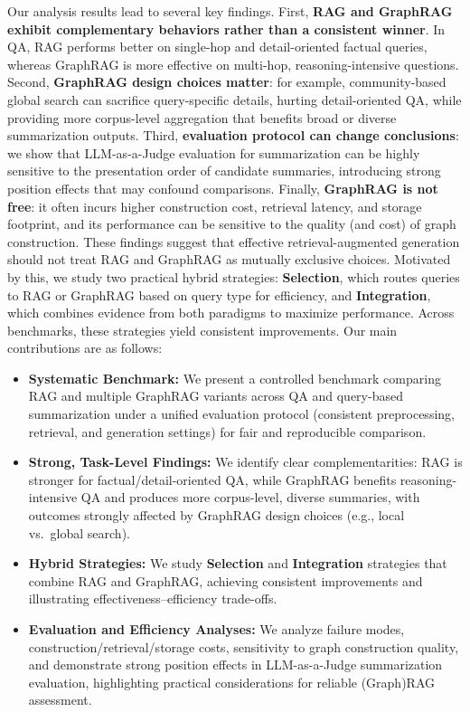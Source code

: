 Our analysis results lead to several key findings. First, \textbf{RAG and GraphRAG exhibit complementary behaviors rather than a consistent winner}. In QA, RAG performs better on single-hop and detail-oriented factual queries, whereas GraphRAG is more effective on multi-hop, reasoning-intensive questions. Second, \textbf{GraphRAG design choices matter}: for example, community-based global search can sacrifice query-specific details, hurting detail-oriented QA, while providing more corpus-level aggregation that benefits broad or diverse summarization outputs. Third, \textbf{evaluation protocol can change conclusions}: we show that LLM-as-a-Judge evaluation for summarization can be highly sensitive to the presentation order of candidate summaries, introducing strong position effects that may confound comparisons. Finally, \textbf{GraphRAG is not free}: it often incurs higher construction cost, retrieval latency, and storage footprint, and its performance can be sensitive to the quality (and cost) of graph construction.
These findings suggest that effective retrieval-augmented generation should not treat RAG and GraphRAG as mutually exclusive choices. Motivated by this, we study two practical hybrid strategies: \textbf{Selection}, which routes queries to RAG or GraphRAG based on query type for efficiency, and \textbf{Integration}, which combines evidence from both paradigms to maximize performance. Across benchmarks, these strategies yield consistent improvements.
Our main contributions are as follows:
\begin{itemize}[leftmargin=*, itemsep=0pt, parsep=0pt]
    \item \textbf{Systematic Benchmark:} We present a controlled benchmark comparing RAG and multiple GraphRAG variants across QA and query-based summarization under a unified evaluation protocol (consistent preprocessing, retrieval, and generation settings) for fair and reproducible comparison.
    \item \textbf{Strong, Task-Level Findings:} We identify clear complementarities: RAG is stronger for factual/detail-oriented QA, while GraphRAG benefits reasoning-intensive QA and produces more corpus-level, diverse summaries, with outcomes strongly affected by GraphRAG design choices (e.g., local vs.\ global search).
    \item \textbf{Hybrid Strategies:} We study \textbf{Selection} and \textbf{Integration} strategies that combine RAG and GraphRAG, achieving consistent improvements and illustrating effectiveness--efficiency trade-offs.
    \item \textbf{Evaluation and Efficiency Analyses:} We analyze failure modes, construction/retrieval/storage costs, sensitivity to graph construction quality, and demonstrate strong position effects in LLM-as-a-Judge summarization evaluation, highlighting practical considerations for reliable (Graph)RAG assessment.
\end{itemize}


